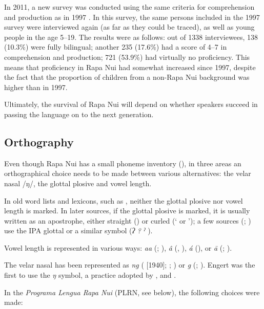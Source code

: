 In 2011, a new survey was conducted using the same criteria for comprehension and production as in 1997 \citep{CalderónHaoaMakihara2011}. In this survey, the same persons included in the 1997 survey were interviewed again (as far as they could be traced), as well as young people in the age 5–19. The results were as follows: out of 1338 interviewees, 138 (10.3\%) were fully bilingual; another 235 (17.6\%) had a score of 4–7 in comprehension and production; 721 (53.9\%) had virtually no proficiency. This means that proficiency in Rapa Nui had somewhat increased since 1997, despite the fact that the proportion of children from a non-Rapa Nui background was higher than in 1997.

Ultimately, the survival of Rapa Nui will depend on whether speakers succeed in passing the language on to the next generation.

\subsection{Orthography}\label{sec:1.4.4}

Even though Rapa Nui has a small phoneme inventory (), in three areas an orthographical choice needs to be made between various alternatives: the velar nasal /ŋ/, the glottal plosive  and vowel length. 

In old word lists and lexicons, such as \citet{Roussel1908}, neither the glottal plosive nor vowel length is marked. In later sources, if the glottal plosive is marked, it is usually written as an apostrophe, either straight ({\ꞌ}) or curled (‘ or ’); a few sources (\citealt{Fuentes1960}; \citealt{Salas1973}) use the IPA glottal or a similar symbol (\textit{ʔ} \textit{?} \textit{ˀ} ). 

Vowel length is represented in various ways: \textit{aa} (\citealt{Fuentes1960}; \citealt{Salas1973}), \textit{â} (\citealt{Englert1978}, \citealt{ConteOliveros1996}), \textit{á} (\citealt{DuFeu1996}), or \textit{ā} (\citealt{Blixen1972}; \citealt{Chapin1978}). 

The velar nasal has been represented as \textit{ng} (\citealt{Métraux1971} [1940]; \citealt{Blixen1972}; \citealt{ConteOliveros1996}) or \textit{g} (\citealt{Roussel1908}; \citealt{Chapin1978}). Engert was the first to use the \textit{ŋ} symbol, a practice adopted by \citet{Fuentes1960}, \citet{Salas1973} and \citet{DuFeu1996}.

In the \textit{Programa Lengua Rapa Nui} (PLRN, see  below), the following choices were made:

